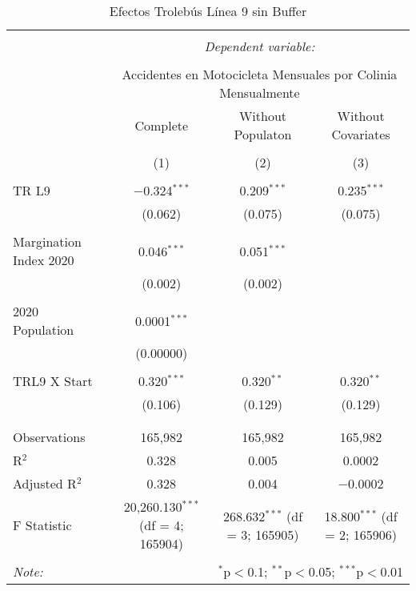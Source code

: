 
\begin{table}[!htbp] \centering 
  \caption{Efectos Trolebús Línea 9 sin Buffer} 
  \label{} 
\begin{tabular}{@{\extracolsep{5pt}}lccc} 
\\[-1.8ex]\hline 
\hline \\[-1.8ex] 
 & \multicolumn{3}{c}{\textit{Dependent variable:}} \\ 
\cline{2-4} 
\\[-1.8ex] & \multicolumn{3}{c}{Accidentes en Motocicleta Mensuales por Colinia Mensualmente} \\ 
 & Complete & Without Populaton & Without Covariates \\ 
\\[-1.8ex] & (1) & (2) & (3)\\ 
\hline \\[-1.8ex] 
 TR L9 & $-$0.324$^{***}$ & 0.209$^{***}$ & 0.235$^{***}$ \\ 
  & (0.062) & (0.075) & (0.075) \\ 
  & & & \\ 
 Margination Index 2020 & 0.046$^{***}$ & 0.051$^{***}$ &  \\ 
  & (0.002) & (0.002) &  \\ 
  & & & \\ 
 2020 Population & 0.0001$^{***}$ &  &  \\ 
  & (0.00000) &  &  \\ 
  & & & \\ 
 TRL9 X Start & 0.320$^{***}$ & 0.320$^{**}$ & 0.320$^{**}$ \\ 
  & (0.106) & (0.129) & (0.129) \\ 
  & & & \\ 
\hline \\[-1.8ex] 
Observations & 165,982 & 165,982 & 165,982 \\ 
R$^{2}$ & 0.328 & 0.005 & 0.0002 \\ 
Adjusted R$^{2}$ & 0.328 & 0.004 & $-$0.0002 \\ 
F Statistic & 20,260.130$^{***}$ (df = 4; 165904) & 268.632$^{***}$ (df = 3; 165905) & 18.800$^{***}$ (df = 2; 165906) \\ 
\hline 
\hline \\[-1.8ex] 
\textit{Note:}  & \multicolumn{3}{r}{$^{*}$p$<$0.1; $^{**}$p$<$0.05; $^{***}$p$<$0.01} \\ 
\end{tabular} 
\end{table} 
